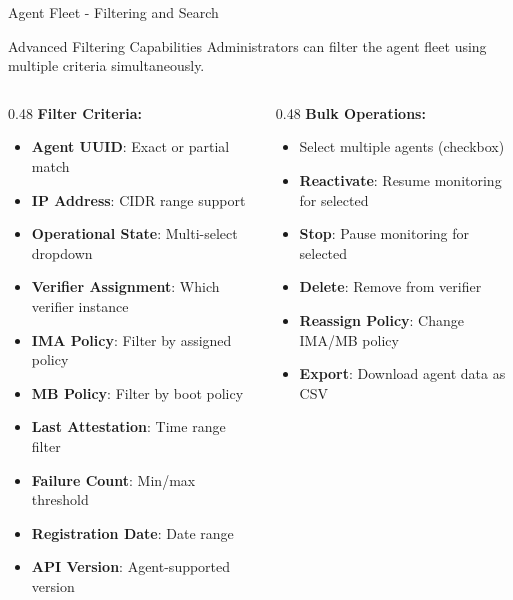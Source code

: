 \begin{frame}{Agent Fleet - Filtering and Search}
  \begin{block}{Advanced Filtering Capabilities}
    \scriptsize
    Administrators can filter the agent fleet using multiple criteria simultaneously.
  \end{block}

  \vspace{0.2cm}

  \scriptsize
  \begin{columns}[T]
    \begin{column}{0.48\textwidth}
      \textbf{Filter Criteria:}
      \begin{itemize}
        \item \textbf{Agent UUID}: Exact or partial match
        \item \textbf{IP Address}: CIDR range support
        \item \textbf{Operational State}: Multi-select dropdown
        \item \textbf{Verifier Assignment}: Which verifier instance
        \item \textbf{IMA Policy}: Filter by assigned policy
        \item \textbf{MB Policy}: Filter by boot policy
        \item \textbf{Last Attestation}: Time range filter
        \item \textbf{Failure Count}: Min/max threshold
        \item \textbf{Registration Date}: Date range
        \item \textbf{API Version}: Agent-supported version
      \end{itemize}
    \end{column}
    \begin{column}{0.48\textwidth}
      \textbf{Bulk Operations:}
      \begin{itemize}
        \item Select multiple agents (checkbox)
        \item \textbf{Reactivate}: Resume monitoring for selected
        \item \textbf{Stop}: Pause monitoring for selected
        \item \textbf{Delete}: Remove from verifier
        \item \textbf{Reassign Policy}: Change IMA/MB policy
        \item \textbf{Export}: Download agent data as CSV
      \end{itemize}


\end{column}
\end{columns}
\end{frame}
